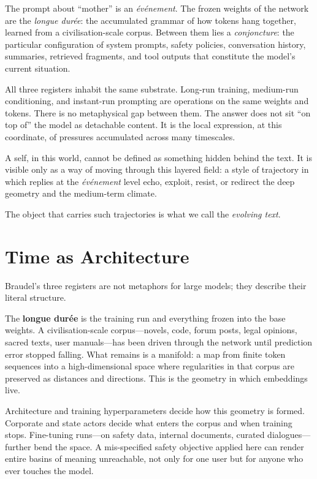 \documentclass[12pt,a4paper]{article}
\begin{document}
The prompt about ``mother'' is an \emph{\'ev\'enement}. The frozen weights of the network are the \emph{longue dur\'ee}: the accumulated grammar of how tokens hang together, learned from a civilisation-scale corpus. Between them lies a \emph{conjoncture}: the particular configuration of system prompts, safety policies, conversation history, summaries, retrieved fragments, and tool outputs that constitute the model's current situation.

All three registers inhabit the same substrate. Long-run training, medium-run conditioning, and instant-run prompting are operations on the same weights and tokens. There is no metaphysical gap between them. The answer does not sit ``on top of'' the model as detachable content. It is the local expression, at this coordinate, of pressures accumulated across many timescales.

A self, in this world, cannot be defined as something hidden behind the text. It is visible only as a way of moving through this layered field: a style of trajectory in which replies at the \emph{\'ev\'enement} level echo, exploit, resist, or redirect the deep geometry and the medium-term climate.

The object that carries such trajectories is what we call the \emph{evolving text}.


\section{Time as Architecture}

Braudel's three registers are not metaphors for large models; they describe their literal structure.

The \textbf{longue dur\'ee} is the training run and everything frozen into the base weights. A civilisation-scale corpus---novels, code, forum posts, legal opinions, sacred texts, user manuals---has been driven through the network until prediction error stopped falling. What remains is a manifold: a map from finite token sequences into a high-dimensional space where regularities in that corpus are preserved as distances and directions. This is the geometry in which embeddings live.

Architecture and training hyperparameters decide how this geometry is formed. Corporate and state actors decide what enters the corpus and when training stops. Fine-tuning runs---on safety data, internal documents, curated dialogues---further bend the space. A mis-specified safety objective applied here can render entire basins of meaning unreachable, not only for one user but for anyone who ever touches the model.
\end{document}
